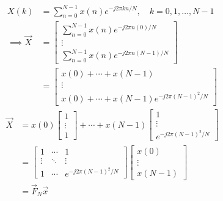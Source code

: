 \documentclass[journal,12pt,twocolumn]{IEEEtran}
\newcommand{\mymat}[1]{\ensuremath{\begin{bmatrix}#1\end{bmatrix}}}
\renewcommand\thesection{\arabic{section}}
\begin{document}
\begin{enumerate}[label=\thesection.\arabic*]
\solution
\begin{align}
	X(k) &= \sum_{n=0}^{N-1} x(n) e^{-j 2 \pi k n / N}, \quad k=0,1, \ldots, N-1 \\
	\implies \vec{X} &= \mymat{\sum_{n=0}^{N-1} x(n) e^{-j 2 \pi  n (0) / N} \\ \vdots \\ \sum_{n=0}^{N-1} x(n) e^{-j 2 \pi  n (N-1) / N}} \\
	&= \mymat{x(0) + \cdots + x(N-1) \\ \vdots \\ x(0) + \cdots + x(N-1) e^{-j 2 \pi (N-1)^2 / N}} 
\end{align}
\begin{align}
		\vec{X} &= x(0) \mymat{1 \\ \vdots \\ 1} + \cdots + x(N-1)\mymat{1 \\ \vdots \\ e^{-j 2 \pi (N-1)^2 / N}} \\
		&= \mymat{1 & \cdots & 1 \\ \vdots & \ddots & \vdots \\ 1 & \cdots & e^{-j 2 \pi (N-1)^2 / N}} \mymat{x(0) \\ \vdots \\ x(N-1)} \\
		&= \vec{F}_N \vec{x}
\end{align}
	

\end{enumerate}
\end{document}
